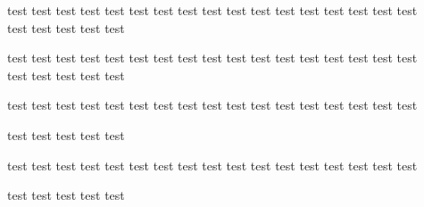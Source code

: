 ﻿\documentclass{ctexart}
\begin{document}
    test test test test test test test test test test test test test test test test test\hspace*{20em}\\ test test test test test 

    test test test test test test test test test test test test test test test test test\\\hspace*{20em} test test test test test 
    
    test test test test test test test test test test test test test test test test test\par test test test test test 

    test test test test test test test test test test test test test test test test test\hspace{10em}\par test test test test test 
\end{document}
